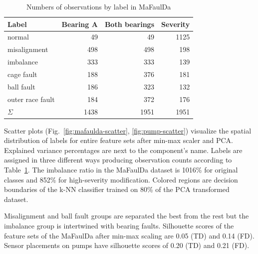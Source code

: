 \documentclass{llncs}
\begin{document}
\begin{table}
\centering
\caption{Numbers of observations by label in MaFaulDa}
\label{tab:mafaulda-observation-counts}
\begin{tabular}{|l|r|r|r|}
\hline
\textbf{Label} &  \textbf{Bearing A} & \textbf{Both bearings} & \textbf{Severity} \\
\hline
normal            &  49  &  49  &  1125 \\
misalignment      & 498  &  498 & 198 \\
imbalance         & 333  &  333 & 139 \\
cage fault        & 188  &  376 & 181 \\
ball fault        & 186  &  323 & 132 \\
outer race fault  & 184  &  372 & 176 \\
\hline
$\Sigma$ & 1438  & 1951 & 1951 \\
\hline
\end{tabular}
\end{table}

Scatter plots (Fig.~\ref{fig:mafaulda-scatter}, \ref{fig:pump-scatter}) visualize the spatial distribution of labels for entire feature sets after min-max scaler and PCA. Explained variance percentages are next to the component's name. Labels are assigned in three different ways producing observation counts according to Table~\ref{tab:mafaulda-observation-counts}. The imbalance ratio in the MaFaulDa dataset is 1016\% for original classes and 852\% for high-severity modification. Colored regions are decision boundaries of the k-NN classifier trained on 80\% of the PCA transformed dataset. 

Misalignment and ball fault groups are separated the best from the rest but the imbalance group is intertwined with bearing faults. Silhouette scores of the feature sets of the MaFaulDa after min-max scaling are 0.05 (TD) and 0.14 (FD). Sensor placements on pumps have silhouette scores of 0.20 (TD) and 0.21 (FD).
\end{document}
